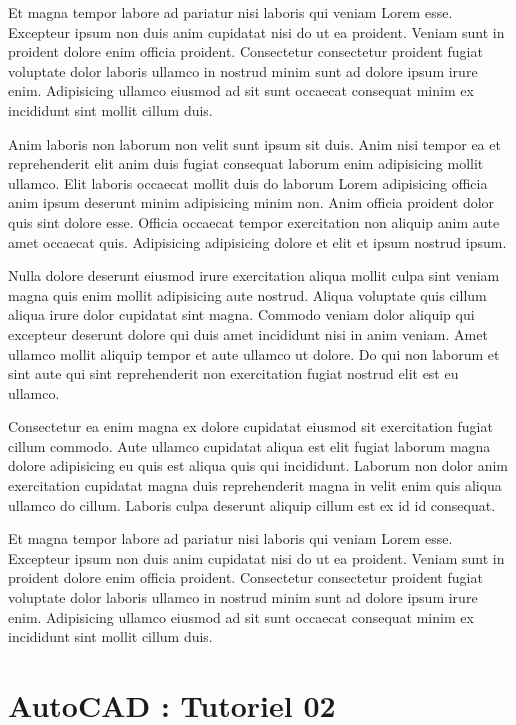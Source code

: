 \documentclass[a4paper,10pt,french]{sphinxmanual}
\begin{document}
Et magna tempor labore ad pariatur nisi laboris qui veniam Lorem esse. Excepteur ipsum non duis anim cupidatat nisi do ut ea proident. Veniam sunt in proident dolore enim officia proident. Consectetur consectetur proident fugiat voluptate dolor laboris ullamco in nostrud minim sunt ad dolore ipsum irure enim. Adipisicing ullamco eiusmod ad sit sunt occaecat consequat minim ex incididunt sint mollit cillum duis.

Anim laboris non laborum non velit sunt ipsum sit duis. Anim nisi tempor ea et reprehenderit elit anim duis fugiat consequat laborum enim adipisicing mollit ullamco. Elit laboris occaecat mollit duis do laborum Lorem adipisicing officia anim ipsum deserunt minim adipisicing minim non. Anim officia proident dolor quis sint dolore esse. Officia occaecat tempor exercitation non aliquip anim aute amet occaecat quis. Adipisicing adipisicing dolore et elit et ipsum nostrud ipsum.

Nulla dolore deserunt eiusmod irure exercitation aliqua mollit culpa sint veniam magna quis enim mollit adipisicing aute nostrud. Aliqua voluptate quis cillum aliqua irure dolor cupidatat sint magna. Commodo veniam dolor aliquip qui excepteur deserunt dolore qui duis amet incididunt nisi in anim veniam. Amet ullamco mollit aliquip tempor et aute ullamco ut dolore. Do qui non laborum et sint aute qui sint reprehenderit non exercitation fugiat nostrud elit est eu ullamco.

Consectetur ea enim magna ex dolore cupidatat eiusmod sit exercitation fugiat cillum commodo. Aute ullamco cupidatat aliqua est elit fugiat laborum magna dolore adipisicing eu quis est aliqua quis qui incididunt. Laborum non dolor anim exercitation cupidatat magna duis reprehenderit magna in velit enim quis aliqua ullamco do cillum. Laboris culpa deserunt aliquip cillum est ex id id consequat.

Et magna tempor labore ad pariatur nisi laboris qui veniam Lorem esse. Excepteur ipsum non duis anim cupidatat nisi do ut ea proident. Veniam sunt in proident dolore enim officia proident. Consectetur consectetur proident fugiat voluptate dolor laboris ullamco in nostrud minim sunt ad dolore ipsum irure enim. Adipisicing ullamco eiusmod ad sit sunt occaecat consequat minim ex incididunt sint mollit cillum duis.


\chapter{AutoCAD : Tutoriel 02}
\label{\detokenize{docs/tuts/autocad-tut02::doc}}\label{\detokenize{docs/tuts/autocad-tut02:autodesk}}\label{\detokenize{docs/tuts/autocad-tut02:autocad-tut02}}\label{\detokenize{docs/tuts/autocad-tut02:autocad-tutoriel-02}}
\end{document}
